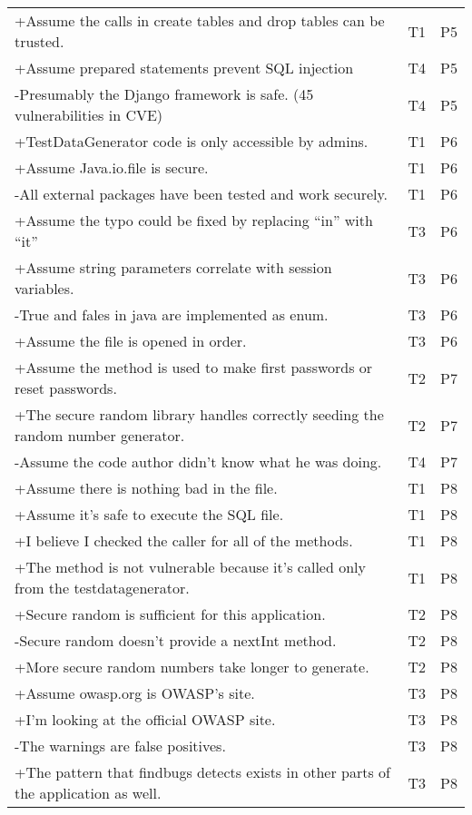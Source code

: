 \documentclass[10pt,journal,compsoc]{IEEEtran}
\begin{document}
\begin{table*}
\begin{tabularx}{\textwidth}{|X|c|c|}
		+Assume the calls in create tables and drop tables can be trusted.	&	T1	&	P5	\\
		+Assume prepared statements prevent SQL injection	&	T4	&	P5	\\
		-Presumably the Django framework is safe. (45 vulnerabilities in CVE) 	&	T4	&	P5	\\
		+TestDataGenerator code is only accessible by admins.	&	T1	&	P6	\\
		+Assume Java.io.file is secure.	&	T1	&	P6	\\
		-All external packages have been tested and work securely.	&	T1	&	P6	\\
		+Assume the typo could be fixed by replacing “in” with “it”	&	T3	&	P6	\\
		+Assume string parameters correlate with session variables.	&	T3	&	P6	\\
		-True and fales in java are implemented as enum.	&	T3	&	P6	\\
		+Assume the file is opened in order.	&	T3	&	P6	\\
		+Assume the method is used to make first passwords or reset passwords.	&	T2	&	P7	\\
		+The secure random library handles correctly seeding the random number generator.	&	T2	&	P7	\\
		-Assume the code author didn’t know what he was doing.	&	T4	&	P7	\\
		+Assume there is nothing bad in the file.	&	T1	&	P8	\\
		+Assume it’s safe to execute the SQL file.	&	T1	&	P8	\\
		+I believe I checked the caller for all of the methods.	&	T1	&	P8	\\
		+The method is not vulnerable because it’s called only from the testdatagenerator.	&	T1	&	P8	\\
		+Secure random is sufficient for this application.	&	T2	&	P8	\\
		-Secure random doesn’t provide a nextInt method. 	&	T2	&	P8	\\
		+More secure random numbers take longer to generate.	&	T2	&	P8	\\
		+Assume owasp.org is OWASP’s site.	&	T3	&	P8	\\
		+I’m looking at the official OWASP site.	&	T3	&	P8	\\
		-The warnings are false positives.	&	T3	&	P8	\\
		+The pattern that findbugs detects exists in other parts of the application as well.	&	T3	&	P8	\\

\end{tabularx}
\end{table*}
\end{document}
